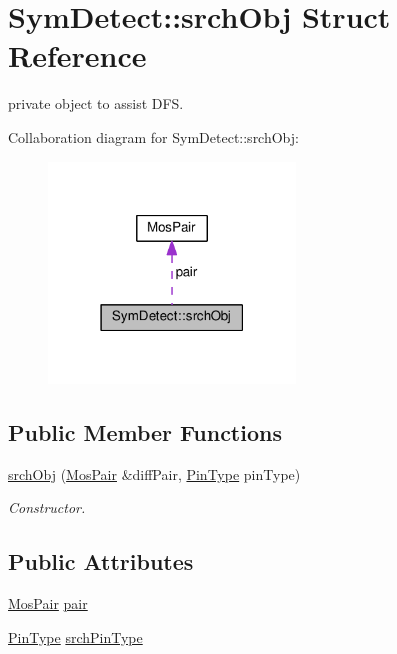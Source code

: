 \hypertarget{structSymDetect_1_1srchObj}{}\section{Sym\+Detect\+:\+:srch\+Obj Struct Reference}
\label{structSymDetect_1_1srchObj}


private object to assist D\+FS.  




Collaboration diagram for Sym\+Detect\+:\+:srch\+Obj\+:\nopagebreak
\begin{figure}[H]
\begin{center}
\leavevmode
\includegraphics[width=186pt]{structSymDetect_1_1srchObj__coll__graph}
\end{center}
\end{figure}
\subsection*{Public Member Functions}
\begin{DoxyCompactItemize}
\item 
\hyperlink{structSymDetect_1_1srchObj_a12d3ae03e9163b5e7bc46a224022880e}{srch\+Obj} (\hyperlink{structMosPair}{Mos\+Pair} \&diff\+Pair, \hyperlink{type_8h_afaab50027002ecbb6c8ac27e727d1bb4}{Pin\+Type} pin\+Type)
\begin{DoxyCompactList}\small\item\em Constructor. \end{DoxyCompactList}\end{DoxyCompactItemize}
\subsection*{Public Attributes}
\begin{DoxyCompactItemize}
\item 
\hyperlink{structMosPair}{Mos\+Pair} \hyperlink{structSymDetect_1_1srchObj_aec9a5afaae2c8dfdf79ff4c654c73ede}{pair}
\item 
\hyperlink{type_8h_afaab50027002ecbb6c8ac27e727d1bb4}{Pin\+Type} \hyperlink{structSymDetect_1_1srchObj_ae7cd64a55ef6fa4dae853e0ff822888a}{srch\+Pin\+Type}
\end{DoxyCompactItemize}


